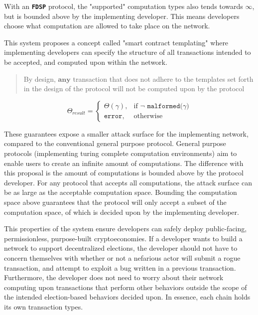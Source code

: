 \documentclass[12pt, titlepage, twocolumn]{report}
\begin{document}
With an \texttt{\textbf{FDSP}} protocol, the "supported" computation types also tends towards \(\infty\), but is bounded above by the implementing developer. This means developers choose what computation are allowed to take place on the network.

This system proposes a concept called "smart contract templating" where implementing developers can specify the structure of all transactions intended to be accepted, and computed upon within the network. 

\begin{quotation}
  By design, \(\boldsymbol{any}\) transaction that does not adhere to the templates set forth in the design of the protocol will not be computed upon by the protocol
 \end{quotation}
 
\begin{equation}
	 \Theta_{result} = 
	\begin{cases}
    	 \Theta(\gamma),	& \text{if } \neg \texttt{ malformed(\(\gamma\))}  \\
    	\texttt{error},    & \text{otherwise}
	\end{cases}
\end{equation}

These guarantees expose a smaller attack surface for the implementing network, compared to the conventional general purpose protocol. General purpose protocols (implementing turing complete computation environments) aim to enable users to create an infinite amount of computations. The difference with this proposal is the amount of computations is bounded above by the protocol developer. For any protocol that accepts all computations, the attack surface can be as large as the acceptable computation space. Bounding the computation space above guarantees that the protocol will only accept a subset of the computation space, of which is decided upon by the implementing developer.

This properties of the system ensure developers can safely deploy public-facing, permissionless, purpose-built cryptoeconomies. If a developer wants to build a network to support decentralized elections, the developer should not have to concern themselves with whether or not a nefarious actor will submit a rogue transaction, and attempt to exploit a bug written in a previous transaction. Furthermore, the developer does not need to worry about their network computing upon transactions that perform other behaviors outside the scope of the intended election-based behaviors decided upon. In essence, each chain holds its own transaction types.
\end{document}
